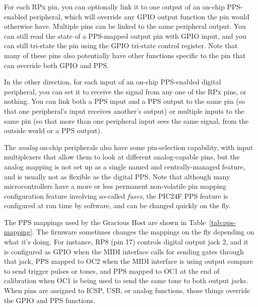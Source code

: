 For each RPx pin, you can optionally link it to one output of an on-chip
PPS-enabled peripheral, which will override any GPIO output function the pin
would otherwise have.  Multiple pins can be linked to the same peripheral
output.  You can still read the state of a PPS-mapped output pin with GPIO
input, and you can still tri-state the pin using the GPIO tri-state control
register.  Note that many of these pins also potentially have other
functions specific to the pin that can override both GPIO and PPS.

In the other direction, for each input of an on-chip PPS-enabled digital
peripheral, you can set it to receive the signal from any one of the RPx
pins, or nothing.  You can link both a PPS input and a PPS output to the
same pin (so that one peripheral's input receives another's output) or
multiple inputs to the same pin (so that more than one peripheral input sees
the same signal, from the outside world or a PPS output).

The \emph{analog} on-chip peripherals also have some pin-selection
capability, with input multiplexers that allow them to look at different
analog-capable pins, but the analog mapping is not set up as a single named
and centrally-managed feature, and is usually not as flexible as the digital
PPS.  Note that although many microcontrollers have a more or less permanent
non-volatile pin mapping configuration feature involving so-called
\emph{fuses}, the PIC24F PPS feature is configured at run time by software,
and can be changed quickly on the fly.

The PPS mappings used by the Gracious Host are shown in
Table~\ref{tab:pps-mapping}.  The firmware sometimes changes the mappings on
the fly depending on what it's doing.  For instance, RP8 (pin 17) controls
digital output jack 2, and it is configured as GPIO when the MIDI interface
calls for sending gates through that jack, PPS mapped to OC2 when the MIDI
interface is using output compare to send trigger pulses or tones, and PPS
mapped to OC1 at the end of calibration when OC1 is being used to send the
same tone to both output jacks.  When pins are assigned to ICSP, USB, or
analog functions, those things override the GPIO and PPS functions.

